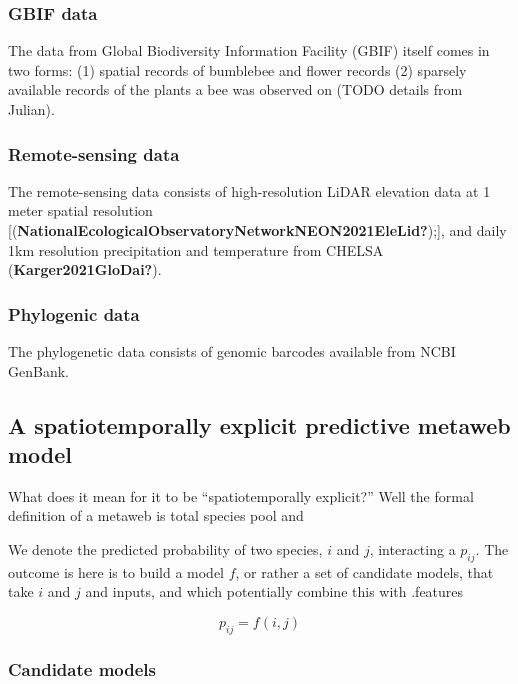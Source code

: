 \documentclass[11pt]{article}
\begin{document}
\hypertarget{gbif-data}{%
\subsubsection{GBIF data}\label{gbif-data}}

The data from Global Biodiversity Information Facility (GBIF) itself
comes in two forms: (1) spatial records of bumblebee and flower records
(2) sparsely available records of the plants a bee was observed on (TODO
details from Julian).

\hypertarget{remote-sensing-data}{%
\subsubsection{Remote-sensing data}\label{remote-sensing-data}}

The remote-sensing data consists of high-resolution LiDAR elevation data
at 1 meter spatial resolution
{[}(\textbf{NationalEcologicalObservatoryNetworkNEON2021EleLid?});{]},
and daily 1km resolution precipitation and temperature from CHELSA
(\textbf{Karger2021GloDai?}).

\hypertarget{phylogenic-data}{%
\subsubsection{Phylogenic data}\label{phylogenic-data}}

The phylogenetic data consists of genomic barcodes available from NCBI
GenBank.

\hypertarget{a-spatiotemporally-explicit-predictive-metaweb-model}{%
\subsection{A spatiotemporally explicit predictive metaweb
model}\label{a-spatiotemporally-explicit-predictive-metaweb-model}}

What does it mean for it to be ``spatiotemporally explicit?'' Well the
formal definition of a metaweb is total species pool and

We denote the predicted probability of two species, \(i\) and \(j\),
interacting a \(p_{ij}\). The outcome is here is to build a model \(f\),
or rather a set of candidate models, that take \(i\) and \(j\) and
inputs, and which potentially combine this with .features

\[p_{ij} = f(i,j)\]

\hypertarget{candidate-models}{%
\subsubsection{Candidate models}\label{candidate-models}}
\end{document}
